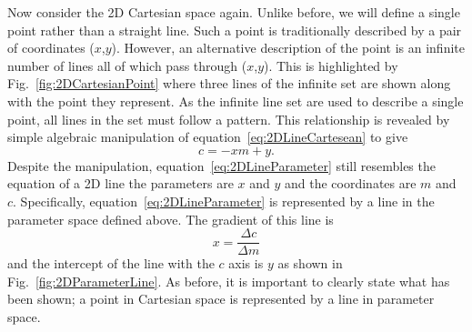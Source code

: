 \newline
\newline
Now consider the 2D Cartesian space again.  Unlike before, we will define a single point rather than a straight line. Such a point is traditionally described by a pair of coordinates ($x$,$y$).  However, an alternative description of the point is an infinite number of lines all of which pass through ($x$,$y$).  This is highlighted by Fig.~\ref{fig:2DCartesianPoint} where three lines of the infinite set are shown along with the point they represent.  As the infinite line set are used to describe a single point, all lines in the set must follow a pattern.  This relationship is revealed by simple algebraic manipulation of equation~\ref{eq:2DLineCartesean} to give
\begin{equation}
  c = -xm + y.
  \label{eq:2DLineParameter}
\end{equation}
Despite the manipulation, equation~\ref{eq:2DLineParameter} still resembles the equation of a 2D line the parameters are $x$ and $y$ and the coordinates are $m$ and $c$.  Specifically, equation~\ref{eq:2DLineParameter} is represented by a line in the parameter space defined above.  The gradient of this line is 
\begin{equation}
  x = \frac{\Delta c}{\Delta m}
  \label{eq:2DLineGradientParameterSpace}
\end{equation}
and the intercept of the line with the $c$ axis is $y$ as shown in Fig.~\ref{fig:2DParameterLine}.  As before, it is important to clearly state what has been shown; a point in Cartesian space is represented by a line in parameter space.
